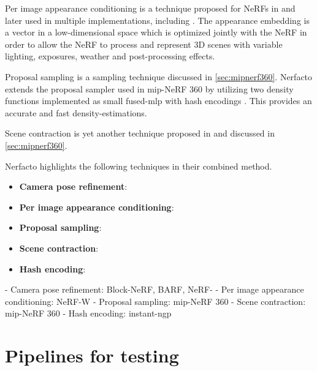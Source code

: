 Per image appearance conditioning is a technique proposed for NeRFs in \cite{martin-brualla_nerf_2021} and later used in multiple implementations, including \cite{tancik_block-nerf_2022}. The appearance embedding is a vector in a low-dimensional space which is optimized jointly with the NeRF in order to allow the NeRF to process and represent 3D scenes with variable lighting, exposures, weather and post-processing effects.

Proposal sampling is a sampling technique discussed in \autoref{sec:mipnerf360}. Nerfacto extends the proposal sampler used in mip-NeRF 360 by utilizing two density functions implemented as small fused-mlp with hash encodings \cite{muller_instant_2022}. This provides an accurate and fast density-estimations.

Scene contraction is yet another technique proposed in \cite{barronMipNeRF360Unbounded2022} and discussed in \autoref{sec:mipnerf360}.




Nerfacto highlights the following techniques in their combined method.
\begin{itemize}
    \item \textbf{Camera pose refinement}:
    \item \textbf{Per image appearance conditioning}:
    \item \textbf{Proposal sampling}:
    \item \textbf{Scene contraction}:
    \item \textbf{Hash encoding}:
\end{itemize}

- Camera pose refinement: Block-NeRF, BARF, NeRF-
- Per image appearance conditioning: NeRF-W
- Proposal sampling: mip-NeRF 360
- Scene contraction: mip-NeRF 360
- Hash encoding: instant-ngp



\section{Pipelines for testing}